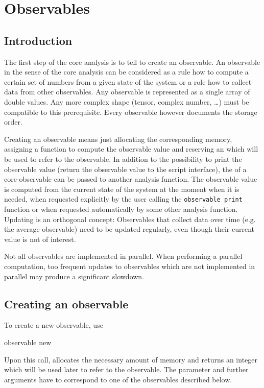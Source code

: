 \section{Observables}


\subsection{Introduction}
The first step of the core analysis is to tell \es to create an observable.
An observable in the sense of the core analysis can be considered as 
a rule how to compute a certain set of numbers from a given state of the system
or a role how to collect data from other observables. Any observable
is represented as a single array of double values. Any more complex
shape (tensor, complex number, \ldots) must be compatible to this
prerequisite. Every observable however documents the storage order.

Creating an observable means just allocating the corresponding memory, assigning a function 
to compute the observable value and reserving an  which will be used to refer 
to the observable. 
In addition to the possibility to  print the observable value 
(return the observable value to the script interface), 
the  of a core-observable can be passed to another analysis function. 
The observable value is computed from the current state of the system
at the moment when it is needed, \ie when requested explicitly by the 
user calling the \verb!observable print! function or when requested
automatically by some other analysis function. Updating is an orthogonal 
concept: Observables that collect data over time (e.g. the average observable)
need to be updated regularly, even though their current value is not
of interest. 

Not all observables are implemented in parallel. When performing a parallel
computation, too frequent updates to observables which are not implemented
in parallel may produce a significant slowdown.

\subsection{Creating an observable}
To create a new observable, use
\begin{essyntax}
  observable new  
\end{essyntax}
  
Upon this call, \es allocates the necessary amount of memory and returns 
an integer  which will be used later to refer to the observable. 
The parameter  and further arguments have to correspond to one of the
observables described below.


